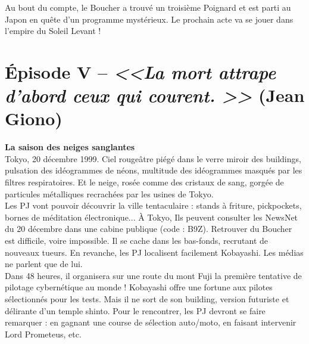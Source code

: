 \documentclass[11pt,twoside,a4paper]{book}
\begin{document}
Au bout du compte, le Boucher a trouv{\'e} un troisi{\`e}me Poignard et est parti au Japon en qu{\^e}te d'un programme myst{\'e}rieux. Le prochain acte va se jouer dans l'empire du Soleil Levant !~\\

\clearpage

\section*{{\'E}pisode V -- \emph{<<\textbf{La mort attrape d'abord ceux qui courent. }>>} (Jean Giono)}


\textbf{\large La saison des neiges sanglantes}~\\

Tokyo, 20 d{\'e}cembre 1999. Ciel rouge{\^a}tre pi{\'e}g{\'e} dans le verre miroir des buildings, pulsation des id{\'e}ogrammes de n{\'e}ons, multitude des id{\'e}ogrammes masqu{\'e}s par les filtres respiratoires. Et le neige, ros{\'e}e comme des cristaux de sang, gorg{\'e}e de particules m{\'e}talliques recrach{\'e}es par les usines de Tokyo.~\\

Les PJ vont pouvoir d{\'e}couvrir la ville tentaculaire : stands {\`a} friture, pickpockets, bornes de m{\'e}ditation {\'e}lectronique... {\`A} Tokyo, Ils peuvent consulter les NewsNet du 20 d{\'e}cembre dans une cabine publique (code : B9Z). Retrouver du Boucher est difficile, voire impossible. Il se cache dans les bas-fonds, recrutant de nouveaux tueurs. En revanche, les PJ localisent facilement Kobayashi. Les m{\'e}dias ne parlent que de lui. ~\\
Dans 48 heures, il organisera sur une route du mont Fuji la premi{\`e}re tentative de pilotage cybern{\'e}tique au monde ! Kobayashi offre une fortune aux pilotes s{\'e}lectionn{\'e}s pour les tests. Mais il ne sort de son building, version futuriste et d{\'e}lirante d'un temple shinto. Pour le rencontrer, les PJ devront se faire remarquer : en gagnant une course de s{\'e}lection auto/moto, en faisant intervenir Lord Prometeus, etc.~\\
\end{document}
